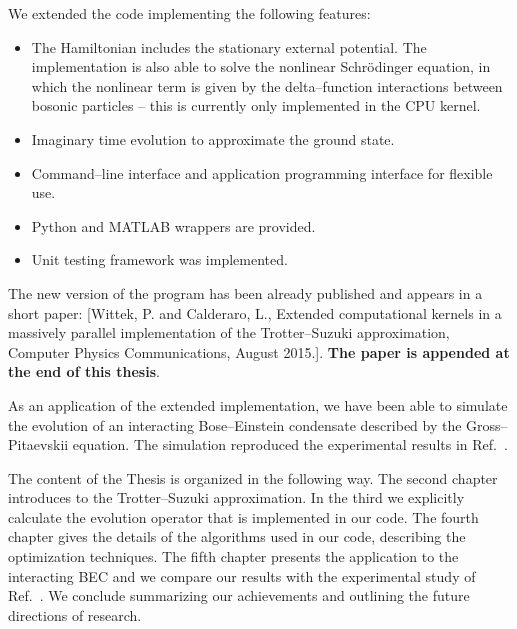 We extended the code implementing the following features:
\begin{itemize}
\item The Hamiltonian includes the stationary external potential. The implementation is also able to solve the nonlinear Schr\"odinger equation, in which the nonlinear term is given by the delta--function interactions between bosonic particles -- this is currently only implemented in the CPU kernel.

\item Imaginary time evolution to approximate the ground state.

\item Command--line interface and application programming interface for flexible use.

\item Python and MATLAB wrappers are provided.

\item Unit testing framework was implemented.

\end{itemize}
The new version of the program has been already published and appears in a short paper: [Wittek, P. and Calderaro, L., Extended computational kernels in a massively parallel implementation of the Trotter--Suzuki approximation, Computer Physics Communications, August 2015.]. \textbf{The paper is appended at the end of this thesis}.

As an application of the extended implementation, we have been able to simulate the evolution of an interacting Bose--Einstein condensate described by the Gross--Pitaevskii equation. The simulation reproduced the experimental results in Ref.~\citep{DSF00}.

The content of the Thesis is organized in the following way. The second chapter introduces to the Trotter--Suzuki approximation. In the third we explicitly calculate the evolution operator that is implemented in our code. The fourth chapter gives the details of the algorithms used in our code, describing the optimization techniques. The fifth chapter presents the application to the interacting BEC and we compare our results with the experimental study of Ref.~\citep{DSF00}. We conclude summarizing our achievements and outlining the future directions of research.